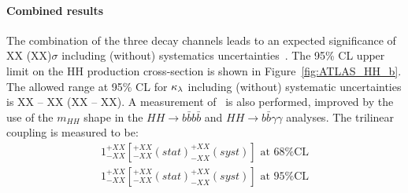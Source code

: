 %
\paragraph{Combined results}

The combination of the three decay channels leads to an expected significance of XX (XX)$\sigma$ including (without) systematics uncertainties~\cite{ATLASHHPUBnote}. The 95\% CL upper limit on the HH production cross-section is shown in Figure~\ref{fig:ATLAS_HH_b}. The allowed range at 95\% CL for $\kappa_{\lambda}$ including (without) systematic uncertainties is XX -- XX (XX -- XX). A measurement of \lHHH\ is also performed, improved by the use of the $m_{HH}$ shape in the $HH \rightarrow b\bar{b}b\bar{b}$ and $HH \rightarrow b\bar{b}\gamma\gamma$ analyses. The trilinear coupling is measured to be:
\[
\begin{split}
1^{+XX}_{-XX} [^{+XX}_{-XX} (stat) ^{+XX}_{-XX} (syst)] \text{ at 68\% CL} \\
1^{+XX}_{-XX} [^{+XX}_{-XX} (stat) ^{+XX}_{-XX} (syst)] \text{ at 95\% CL}
\end{split}
\]


